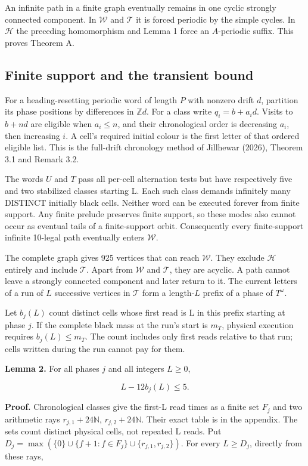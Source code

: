 \documentclass[
  11pt,
]{article}
\begin{document}
An infinite path in a finite graph eventually remains in one cyclic
strongly connected component. In \(\mathcal W\) and \(\mathcal T\) it is
forced periodic by the simple cycles. In \(\mathcal H\) the preceding
homomorphism and Lemma 1 force an \(A\)-periodic suffix. This proves
Theorem A.

\subsection{Finite support and the transient bound}\label{ten-5}

For a heading-resetting periodic word of length \(P\) with nonzero drift
\(d\), partition its phase positions by differences in \(\mathbb Z d\).
For a class write \(q_i=b+a_i d\). Visits to \(b+nd\) are eligible when
\(a_i\le n\), and their chronological order is decreasing \(a_i\), then
increasing \(i\). A cell's required initial colour is the first letter
of that ordered eligible list. This is the full-drift chronology method
of Jillhewar (2026), Theorem 3.1 and Remark 3.2.

The words \(U\) and \(T\) pass all per-cell alternation tests but have
respectively five and two stabilized classes starting L. Each such class
demands infinitely many DISTINCT initially black cells. Neither word can
be executed forever from finite support. Any finite prelude preserves
finite support, so these modes also cannot occur as eventual tails of a
finite-support orbit. Consequently every finite-support infinite
10-legal path eventually enters \(\mathcal W\).

The complete graph gives 925 vertices that can reach \(\mathcal W\).
They exclude \(\mathcal H\) entirely and include \(\mathcal T\). Apart
from \(\mathcal W\) and \(\mathcal T\), they are acyclic. A path cannot
leave a strongly connected component and later return to it. The current
letters of a run of \(L\) successive vertices in \(\mathcal T\) form a
length-\(L\) prefix of a phase of \(T^\omega\).

Let \(b_j(L)\) count distinct cells whose first read is L in this prefix
starting at phase \(j\). If the complete black mass at the run's start
is \(m_T\), physical execution requires \(b_j(L)\le m_T\). The count
includes only first reads relative to that run; cells written during the
run cannot pay for them.

\textbf{Lemma 2.} For all phases \(j\) and all integers \(L\ge0\),

\[L-12b_j(L)\le5.\]

\textbf{Proof.} Chronological classes give the first-L read times as a
finite set \(F_j\) and two arithmetic rays \(r_{j,1}+24\mathbb N\),
\(r_{j,2}+24\mathbb N\). Their exact table is in the appendix. The sets
count distinct physical cells, not repeated L reads. Put
\(D_j=\max(\{0\}\cup\{f+1:f\in F_j\}\cup\{r_{j,1},r_{j,2}\})\). For
every \(L\ge D_j\), directly from these rays,
\end{document}
